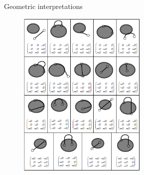\begin{frame}{Geometric interpretations}	
\begin{figure}[l]
\includegraphics[width = 0.55\textwidth]{images/9intersection.png}
\end{figure} 
\end{frame}

